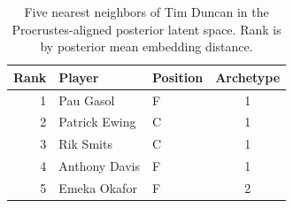 \begin{table}[htbp]
  \centering\small
  \begin{tabular}{rllc}
    \toprule
    Rank & Player & Position & Archetype \\
    \midrule
    1 & Pau Gasol & F & 1 \\
    2 & Patrick Ewing & C & 1 \\
    3 & Rik Smits & C & 1 \\
    4 & Anthony Davis & F & 1 \\
    5 & Emeka Okafor & F & 2 \\
    \bottomrule
  \end{tabular}
  \caption{Five nearest neighbors of Tim Duncan in the Procrustes-aligned posterior latent space. Rank is by posterior mean embedding distance.}
  \label{tab:Tim_Duncan_neighbors}
\end{table}

